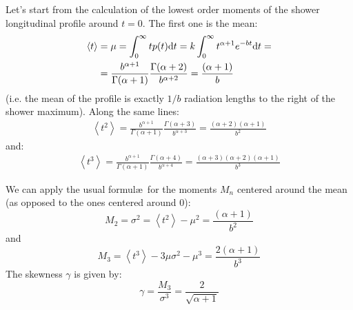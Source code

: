 \documentclass[a4paper,11pt]{article}
\begin{document}
Let's start from the calculation of the lowest order moments of the shower
longitudinal profile around $t=0$. The first one is the mean:
\begin{align}
\left< t \right> &= \mu = \int_{0}^\infty t p(t) {\rm d}t =
k \int_{0}^\infty t^{\alpha + 1} e^{-bt} {\rm d}t =\nonumber\\
&= \frac{b^{\alpha + 1}}{\Gamma(\alpha + 1)}
\frac{\Gamma(\alpha + 2)}{b^{\alpha + 2}} = \frac{(\alpha + 1)}{b}
\end{align}
(i.e. the mean of the profile is exactly $1/b$ radiation lengths to the
right of the shower maximum). Along the same lines:
\begin{align}
\left< t^2 \right> = \frac{b^{\alpha + 1}}{\Gamma(\alpha + 1)}
\frac{\Gamma(\alpha + 3)}{b^{\alpha + 3}} =
\frac{(\alpha + 2)(\alpha + 1)}{b^2}
\end{align}
and:
\begin{align}
\left< t^3 \right> = \frac{b^{\alpha + 1}}{\Gamma(\alpha + 1)}
\frac{\Gamma(\alpha + 4)}{b^{\alpha + 4}} =
\frac{(\alpha + 3)(\alpha + 2)(\alpha + 1)}{b^3}
\end{align}

We can apply the usual formul\ae\ for the moments $M_n$ centered around the
mean (as opposed to the ones centered around 0):
\begin{equation}
M_2 = \sigma^2 = \left< t^2 \right> - \mu^2 =
\frac{(\alpha + 1)}{b^2}
\end{equation}
and
\begin{equation}
M_3 = \left< t^3 \right> - 3\mu\sigma^2 - \mu^3 = \frac{2(\alpha + 1)}{b^3}
\end{equation}
The skewness $\gamma$ is given by:
\begin{equation}
\gamma = \frac{M_3}{\sigma^3} = \frac{2}{\sqrt{\alpha + 1}}
\end{equation}
\end{document}
